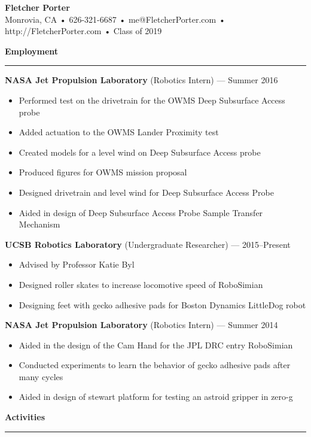 \documentclass[12pt, oneside]{article}
\newcommand{\titlestyle}[1] {
	{\fontsize{50pt}{1em}\selectfont \bf \textcolor{new_red}{#1}} \\
}
\newcommand{\headingstyleJobs}[1] {
	{\fontsize{20pt}{1em}\selectfont \bf \textcolor{new_red}{#1}}
	\textcolor{new_red}{\rule{3.25in}{0.5pt}} \vspace{3pt}
}
\newcommand{\infostyle}[1] {
	{\fontsize{10pt}{1em}\selectfont #1} \\ \vspace{9pt}
}
\newcommand{\jobtitle}[2] {
	{\bf #1} {#2} \vspace{-10pt} \\
}
\begin{document}
\begin{flushleft}


\titlestyle{Fletcher Porter}
\infostyle{Monrovia, CA • 626-321-6687 • me@FletcherPorter.com • http://FletcherPorter.com • Class of 2019}

\headingstyleJobs{Employment}

\jobtitle{NASA Jet Propulsion Laboratory}{(Robotics Intern) — Summer 2016}
\begin{itemize}
	\item Performed test on the drivetrain for the OWMS Deep Subsurface Access probe
	\item Added actuation to the OWMS Lander Proximity test
	\item Created models for a level wind on Deep Subsurface Access probe
	\item Produced figures for OWMS mission proposal
	\item Designed drivetrain and level wind for Deep Subsurface Access Probe
	\item Aided in design of Deep Subsurface Access Probe Sample Transfer Mechanism
\end{itemize}

\jobtitle{UCSB Robotics Laboratory}{(Undergraduate Researcher) — 2015–Present}
\begin{itemize}
	\item Advised by Professor Katie Byl
	\item Designed roller skates to increase locomotive speed of RoboSimian
	\item Designing feet with gecko adhesive pads for Boston Dynamics LittleDog robot
\end{itemize}

\jobtitle{NASA Jet Propulsion Laboratory}{(Robotics Intern) — Summer 2014}
\begin{itemize}
	\item Aided in the design of the Cam Hand for the JPL DRC entry RoboSimian
	\item Conducted experiments to learn the behavior of gecko adhesive pads after many cycles
	\item Aided in design of stewart platform for testing an astroid gripper in zero-g
\end{itemize}


\headingstyleJobs{Activities}


\end{flushleft}
\end{document}
